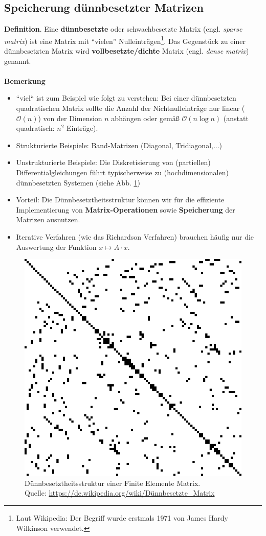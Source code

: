\subsection{Speicherung dünnbesetzter Matrizen} \label{sec:sparseMatrix}
\textbf{Definition}. 
Eine \textbf{dünnbesetzte} oder schwachbesetzte Matrix (engl. \textit{sparse matrix}) ist eine Matrix mit ``vielen'' Nulleinträgen\footnote{Laut Wikipedia: Der Begriff wurde erstmals 1971 von James Hardy Wilkinson verwendet.}. Das Gegenstück zu einer dünnbesetzten Matrix wird \textbf{vollbesetzte/dichte} Matrix (engl. \textit{dense matrix}) genannt.
~\\~\\
\textbf{Bemerkung}
\begin{itemize}
	\item ``viel`` ist zum Beispiel wie folgt zu verstehen: Bei einer dünnbesetzten quadratischen Matrix sollte die Anzahl der Nichtnulleinträge nur linear ($\mathcal{O}(n)$) von der Dimension $n$ abhängen oder gemäß $\mathcal{O}(n\log n)$ (anstatt quadratisch: $n^2$ Einträge).
	\item Strukturierte Beispiele: Band-Matrizen (Diagonal, Tridiagonal,...)
	\item Unstrukturierte Beispiele: Die Diskretisierung von (partiellen) Differentialgleichungen führt typischerweise zu (hochdimensionalen) dünnbesetzten Systemen (siehe Abb. \ref{fig:sparseFEM})
	\item Vorteil: Die Dünnbesetztheitsstruktur können wir für die effiziente Implementierung von \textbf{Matrix-Operationen} sowie \textbf{Speicherung} der Matrizen ausnutzen.
	\item Iterative Verfahren (wie das Richardson Verfahren) brauchen häufig nur die Auswertung der Funktion $x \mapsto A\cdot x$. %
\end{itemize}
\begin{figure}[h!]
	\centering
		\includegraphics[width=0.4\linewidth]{./media//sparse_matrix}
		\caption[Dünnbesetztheitsstruktur]{Dünnbesetztheitsstruktur einer Finite Elemente Matrix.\\ Quelle: \url{https://de.wikipedia.org/wiki/Dünnbesetzte_Matrix}}		
		\label{fig:sparseFEM}
\end{figure}
